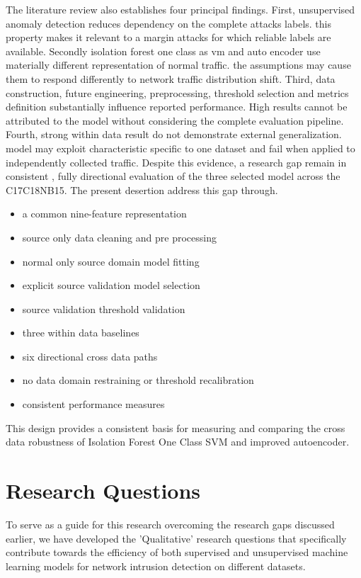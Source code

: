 The literature review also establishes four principal findings. First, unsupervised anomaly detection reduces dependency on the complete attacks labels. this property makes it relevant to a margin attacks for which reliable labels are available.
 Secondly isolation forest one class as vm and auto encoder use materially different representation of normal traffic. the assumptions may cause them to respond differently to network traffic distribution shift.
 Third, data construction, future engineering, preprocessing, threshold selection and metrics definition substantially influence reported performance. High results cannot be attributed to the model without considering the complete evaluation pipeline.
 Fourth, strong within data result do not demonstrate external generalization. model may exploit characteristic specific to one dataset and fail when applied to independently collected traffic. Despite this evidence, a research gap remain in  consistent , fully directional evaluation of the three selected model across the C17C18NB15. The present desertion address this gap through.
 
 \begin {itemize}
 	    \item a common nine-feature representation
	    \item source only data cleaning and pre processing
	    \item normal only source domain model fitting
	    \item explicit source validation model selection
	    \item source validation threshold validation
	    \item three within data baselines
	    \item six directional cross data paths
	    \item no data domain restraining or threshold recalibration
	    \item consistent performance measures
\end{itemize}

This design provides a consistent basis for measuring and comparing the cross data robustness of Isolation Forest One Class SVM and  improved autoencoder.

 \section{Research Questions}
To serve as a guide for this research overcoming the research gaps discussed earlier, we have developed the 'Qualitative' research questions that specifically
contribute towards the efficiency of both supervised and unsupervised machine learning models for network intrusion detection on different
datasets.

